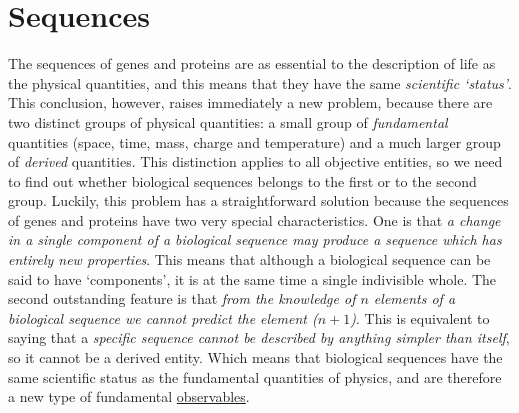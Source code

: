 \documentclass[12pt]{article}
\begin{document}
\section{Sequences}
The sequences of genes and proteins are as essential to the description of life as the \hypertarget{physical_quantities}{physical quantities}, and this means that they have the same \textit{scientific `status'}. This conclusion, however, raises immediately a new problem, because there are two distinct groups of physical quantities: a small group of \textit{fundamental} quantities (space, time, mass, charge and temperature) and a much larger group of \textit{derived} quantities. This distinction applies to all objective entities, so we need to find out whether biological sequences belongs to the first or to the second group. Luckily, this problem has a straightforward solution because the sequences of genes and proteins have two very special characteristics. One is that \textit{a change in a single component of a biological sequence may produce a sequence which has entirely new properties}. This means that although a biological sequence can be said to have `components', it is at the same time a single indivisible whole. The second outstanding feature is that \textit{from the knowledge of $n$ elements of a biological sequence we cannot predict the element ($n+1$)}. This is equivalent to saying that a \textit{specific sequence cannot be described by anything simpler than itself}, so it cannot be a derived entity. Which means that biological sequences have the same scientific status as the fundamental quantities of physics, and are therefore a new type of fundamental \hyperlink{observables}{observables}. 


\hypertarget{signs}{}
\end{document}
